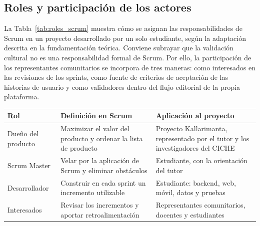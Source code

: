 \subsection{Roles y participación de los actores}
La Tabla~\ref{tab:roles_scrum} muestra cómo se asignan las responsabilidades de Scrum en un proyecto desarrollado por un solo estudiante, según la adaptación descrita en la fundamentación teórica. Conviene subrayar que la validación cultural no es una responsabilidad formal de Scrum. Por ello, la participación de los representantes comunitarios se incorpora de tres maneras: como interesados en las revisiones de los sprints, como fuente de criterios de aceptación de las historias de usuario y como validadores dentro del flujo editorial de la propia plataforma.

{\centering\singlespacing
  \label{tab:roles_scrum}
  \begin{tabular}{|p{}|p{}|p{}|}
    \hline
    \textbf{Rol} & \textbf{Definición en Scrum} & \textbf{Aplicación al proyecto} \tabularnewline
    \hline
    \raggedright\hspace{0pt}Dueño del producto & \raggedright\hspace{0pt}Maximizar el valor del producto y ordenar la lista de producto & \raggedright\hspace{0pt}Proyecto Kallarimanta, representado por el tutor y los investigadores del CICHE \tabularnewline
    \hline
    \raggedright\hspace{0pt}Scrum Master & \raggedright\hspace{0pt}Velar por la aplicación de Scrum y eliminar obstáculos & \raggedright\hspace{0pt}Estudiante, con la orientación del tutor \tabularnewline
    \hline
    \raggedright\hspace{0pt}Desarrollador & \raggedright\hspace{0pt}Construir en cada sprint un incremento utilizable & \raggedright\hspace{0pt}Estudiante: backend, web, móvil, datos y pruebas \tabularnewline
    \hline
    \raggedright\hspace{0pt}Interesados & \raggedright\hspace{0pt}Revisar los incrementos y aportar retroalimentación & \raggedright\hspace{0pt}Representantes comunitarios, docentes y estudiantes \tabularnewline
    \hline
  \end{tabular}\par}

